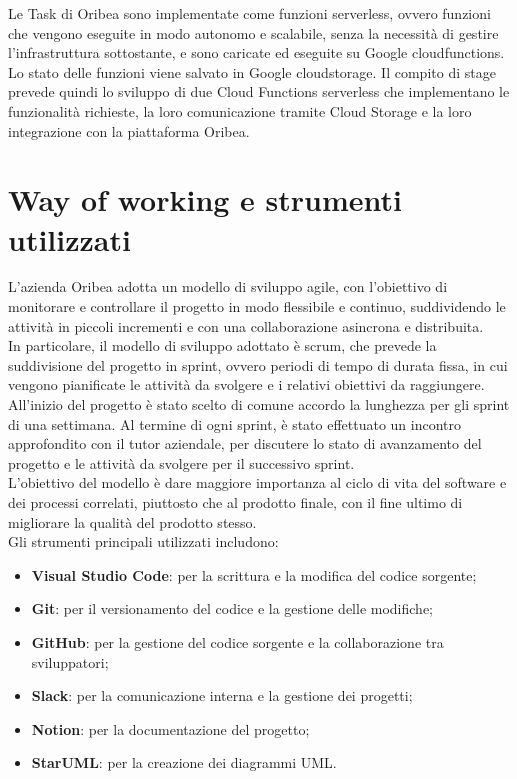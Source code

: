 Le Task di Oribea sono implementate come funzioni serverless, ovvero funzioni che vengono eseguite in modo autonomo e scalabile, senza la necessità di gestire l'infrastruttura sottostante, e sono caricate ed eseguite su Google \gls{cloudfunctions}\glsfirstoccur{}. Lo stato delle funzioni viene salvato in Google \gls{cloudstorage}\glsfirstoccur{}. Il compito di stage prevede quindi lo sviluppo di due Cloud Functions serverless che implementano le funzionalità richieste, la loro comunicazione tramite Cloud Storage e la loro integrazione con la piattaforma Oribea.\\


\section{Way of working e strumenti utilizzati}
\label{sec:way-of-working}

L’azienda Oribea adotta un modello di sviluppo \gls{agile}\glsfirstoccur{}, con l’obiettivo di monitorare e controllare il progetto in modo flessibile e continuo, suddividendo le attività in piccoli incrementi e con una collaborazione asincrona e distribuita.\\
In particolare, il modello di sviluppo adottato è \gls{scrum}\glsfirstoccur{}, che prevede la suddivisione del progetto in sprint, ovvero periodi di tempo di durata fissa, in cui vengono pianificate le attività da svolgere e i relativi obiettivi da raggiungere. All'inizio del progetto è stato scelto di comune accordo la lunghezza per gli sprint di una settimana. Al termine di ogni sprint, è stato effettuato un incontro approfondito con il tutor aziendale, per discutere lo stato di avanzamento del progetto e le attività da svolgere per il successivo sprint.\\
L’obiettivo del modello è dare maggiore importanza al ciclo di vita del software e dei processi correlati, piuttosto che al prodotto finale, con il fine ultimo di migliorare la qualità del prodotto stesso.\\

Gli strumenti principali utilizzati includono:
\begin{itemize}
    \item \textbf{Visual Studio Code}: per la scrittura e la modifica del codice sorgente;
    \item \textbf{Git}: per il versionamento del codice e la gestione delle modifiche;
    \item \textbf{GitHub}: per la gestione del codice sorgente e la collaborazione tra sviluppatori;
    \item \textbf{Slack}: per la comunicazione interna e la gestione dei progetti;
    \item \textbf{Notion}: per la documentazione del progetto;
    \item \textbf{StarUML}: per la creazione dei diagrammi UML.
\end{itemize}

